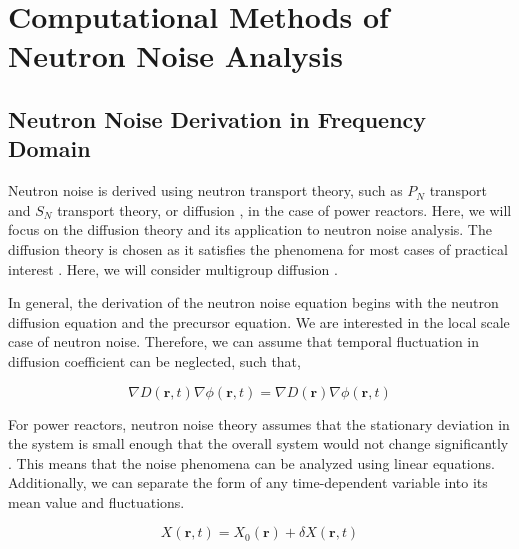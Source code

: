 \section{Computational Methods of Neutron Noise Analysis}
\subsection{Neutron Noise Derivation in Frequency Domain}

Neutron noise is derived using neutron transport theory, such as $P_N$ transport and $S_N$ transport theory, or diffusion \cite{bahramiNewApproachCalculation2020, demaziereDevelopment2D2group2004}, in the case of power reactors. Here, we will focus on the diffusion theory and its application to neutron noise analysis. The diffusion theory is chosen as it satisfies the phenomena for most cases of practical interest \cite{pazsitNoiseTechniquesNuclear2010}. Here, we will consider multigroup diffusion \cite{pazsitNoiseTechniquesNuclear2010}. 

In general, the derivation of the neutron noise equation begins with the neutron diffusion equation and the precursor equation. We are interested in the local scale case of neutron noise. Therefore, we can assume that temporal fluctuation in diffusion coefficient can be neglected, such that,

\begin{equation}
        \nabla D(\textbf{r}, t) \nabla \phi(\textbf{r}, t) = \nabla D(\textbf{r}) \nabla \phi(\textbf{r}, t)
\end{equation}

For power reactors, neutron noise theory assumes that the stationary deviation in the system is small enough that the overall system would not change significantly \cite{pazsitNoiseTechniquesNuclear2010}. This means that the noise phenomena can be analyzed using linear equations. Additionally, we can separate the form of any time-dependent variable into its mean value and fluctuations.

\begin{equation}
        X(\textbf{r}, t) = X_0 (\textbf{r}) + \delta X(\textbf{r}, t)
        \label{eq:fluctuation}
\end{equation}

